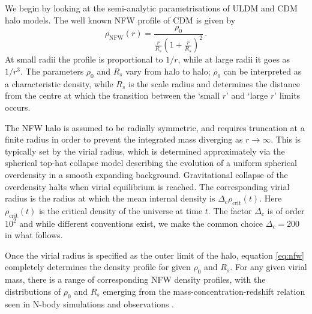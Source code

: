 \documentclass{pasa}%
\begin{document}
We begin by looking at the semi-analytic parametrisations of ULDM and CDM halo models. The  well known  NFW   profile of CDM \cite{Navarro:1995iw, Maccio:2008pcd}  is given by
%
\begin{equation}\label{eq:nfw}
    \rho_\mathrm{NFW}(r)=\frac{\rho_0}{\frac{r}{R_s}\left(1+\frac{r}{R_s}\right)^2} \, .
\end{equation}
%
At small radii the profile is proportional to $1/r$, while at large radii it goes as $1/r^3$. The parameters $\rho_0$ and $R_s$ vary from halo to halo; $\rho_0$ can be interpreted as a characteristic density, while $R_s$ is the scale radius and determines the distance from the centre at which the transition between the `small $r$' and `large $r$' limits occurs. 

The NFW halo is assumed to be radially symmetric, and requires truncation at a finite radius in order to prevent the integrated mass  diverging as $r\rightarrow \infty$. This is typically set by the virial radius, which is  determined approximately via the spherical top-hat collapse model \cite{White:2000jv, Suto:2015jdt, Herrera:2017epn} describing the evolution of a uniform spherical overdensity in a smooth expanding background. Gravitational collapse of the overdensity halts when virial equilibrium is reached. The corresponding virial radius is the radius at which the mean internal density is $\Delta_c \rho_\mathrm{crit}(t)$. Here $\rho_\mathrm{crit}(t)$ is the critical density of the universe at time $t$. The  factor $\Delta_c$ is of order $10^2$ and while different conventions exist, we  make the common choice $\Delta_c = 200$ \cite{Richings:2018} in what follows. 

Once the virial radius is specified as the outer limit of the halo, equation \ref{eq:nfw} completely determines the density profile for given  $\rho_0$ and $R_s$. For any given virial mass, there is a range of corresponding NFW density profiles, with the distributions of $\rho_0$ and $R_s$ emerging from the mass-concentration-redshift relation seen in N-body simulations and observations \cite{Ludlow:2013vxa, Ragagnin:2018enf}. 

\end{document}
